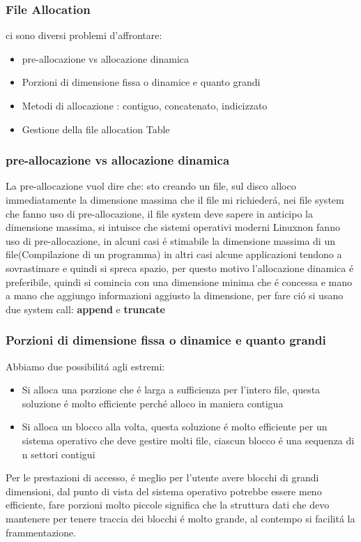 \subsubsection{File Allocation}
ci sono diversi problemi d'affrontare:
\begin{itemize}
    \item pre-allocazione vs allocazione dinamica
    \item Porzioni di dimensione fissa o dinamice e quanto grandi
    \item Metodi di allocazione : contiguo, concatenato, indicizzato
    \item Gestione della file allocation Table
\end{itemize}
\subsubsection*{pre-allocazione vs allocazione dinamica}
La pre-allocazione vuol dire che: sto creando un file, sul disco alloco immediatamente la dimensione massima che il file
mi richiederá, nei file system che fanno uso di pre-allocazione, il file system deve sapere in anticipo la dimensione massima,
si intuisce che sistemi operativi moderni Linux\ldotsecc non fanno uso di pre-allocazione, in alcuni casi é stimabile
la dimensione massima di un file(Compilazione di un programma) in altri casi alcune applicazioni tendono a sovrastimare e quindi
si spreca spazio, per questo motivo l'allocazione dinamica é preferibile, quindi si comincia con una dimensione minima che é concessa
e mano a mano che aggiungo informazioni aggiusto la dimensione, per fare ció si usano due system call: \textbf{append} e \textbf{truncate}
\subsubsection*{Porzioni di dimensione fissa o dinamice e quanto grandi}
Abbiamo due possibilitá agli estremi:
\begin{itemize}
    \item Si alloca una porzione che é larga a sufficienza per l'intero file, questa soluzione é molto efficiente perché alloco in maniera contigua
    \item Si alloca un blocco alla volta, questa soluzione é molto efficiente per un sistema operativo che deve gestire molti file, ciascun blocco é una sequenza di n settori contigui
\end{itemize}
Per le prestazioni di accesso, é meglio per l'utente avere blocchi di grandi dimensioni, dal punto di vista del sistema operativo
potrebbe essere meno efficiente, fare porzioni molto piccole significa che la struttura dati che devo mantenere per tenere traccia
dei blocchi é molto grande, al contempo si facilitá la frammentazione.


